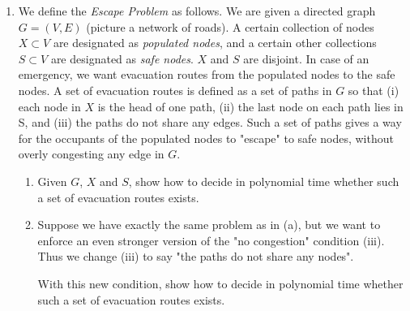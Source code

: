 \documentclass{article}
\begin{document}
\begin{enumerate}
\item We define the \textit{Escape Problem} as follows. We are given a directed graph $G=(V,E)$ (picture a network of roads). A certain collection of nodes $X \subset V$ are designated as \textit{populated nodes}, and a certain other collections $S \subset V$ are designated as \textit{safe nodes}. $X$ and $S$ are disjoint. In case of an emergency, we want evacuation routes from the populated nodes to the safe nodes. A set of evacuation routes is defined as a set of paths in $G$ so that (i) each node in $X$ is the head of one path, (ii) the last node on each path lies in S, and (iii) the paths do not share any edges. Such a set of paths gives a way for the occupants of the populated nodes to "escape" to safe nodes, without overly congesting any edge in $G$.

\begin{enumerate}
    \item Given $G$, $X$ and $S$, show how to decide in polynomial time whether such a set of evacuation routes exists.
    \item Suppose we have exactly the same problem as in (a), but we want to enforce an even stronger version of the "no congestion" condition (iii). Thus we change (iii) to say "the paths do not share any nodes". 
    
    With this new condition, show how to decide in polynomial time whether such a set of evacuation routes exists. 
    

\end{enumerate}
\end{enumerate}
\end{document}
